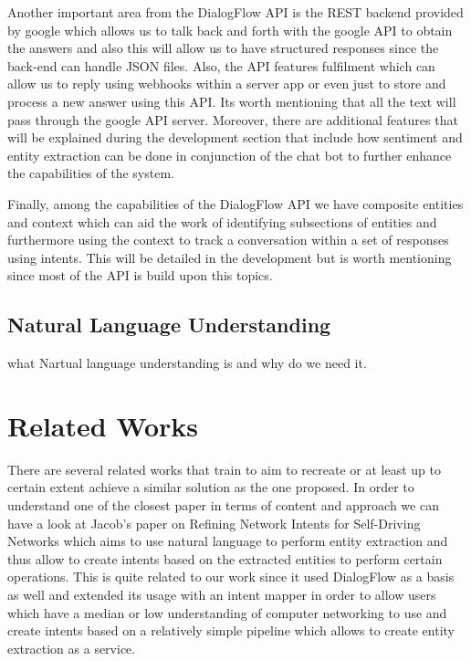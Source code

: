 Another important area from the DialogFlow API is the REST backend provided by google which allows us to talk back and forth with the google API to obtain the answers and also this will allow us to have structured responses since the back-end can handle JSON files. Also, the API features fulfilment which can allow us to reply using webhooks within a server app or even just to store and process a new answer using this API. Its worth mentioning that all the text will pass through the google API server. Moreover, there are additional features that will be explained during the development section that include how sentiment and entity extraction can be done in conjunction of the chat bot to further enhance the capabilities of the system. 

Finally, among the capabilities of the DialogFlow API we have composite entities and context which can aid the work of identifying subsections of entities and furthermore using the context to track a conversation within a set of responses using intents. This will be detailed in the development but is worth mentioning since most of the API is build upon this topics.

\section{Natural Language Understanding}
what Nartual language understanding is and why do we need it.

\chapter{Related Works}

There are several related works that train to aim to recreate or at least up to certain extent achieve a similar solution as the one proposed. In order to understand one of the closest paper in terms of content and approach we can have a look at Jacob's \cite{networkIntents} paper on Refining Network Intents for Self-Driving Networks which aims to use natural language to perform entity extraction and thus allow to create intents based on the extracted entities to perform certain operations. This is quite related to our work since it used DialogFlow as a basis as well and extended its usage with an intent mapper in order to allow users which have a median or low understanding of computer networking to use and create intents based on a relatively simple pipeline which allows to create entity extraction as a service.

